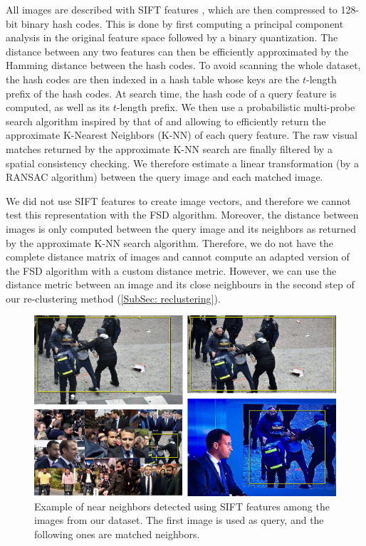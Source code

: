\begin{enumerate}
    All images are described with SIFT features \cite{lowe1999object}, which are then compressed to 128-bit binary hash codes. This is done by first computing a principal component analysis in the original feature space followed by a binary quantization. The distance between any two features can then be efficiently approximated by the Hamming distance between the hash codes. To avoid scanning the whole dataset, the hash codes are then indexed in a hash table whose keys are the $t$-length prefix of the hash codes. At search time, the hash code  of a query feature is computed, as well as its $t$-length prefix. We then use a probabilistic multi-probe search algorithm inspired by that of \cite{joly2008posteriori} and allowing to efficiently return the approximate K-Nearest Neighbors (K-NN) of each query feature. The raw visual matches returned by the approximate K-NN search are finally filtered by a spatial consistency checking. We therefore estimate a linear transformation (by a RANSAC algorithm) between the query image and each matched image.
    
    We did not use SIFT features to create image vectors, and therefore we cannot test this representation with the FSD algorithm. Moreover, the distance between images is only computed between the query image and its neighbors as returned by the approximate K-NN search algorithm. Therefore, we do not have the complete distance matrix of images and cannot compute an adapted version of the FSD algorithm with a custom distance metric. However, we can use the distance metric between an image and its close neighbours in the second step of our re-clustering method (\ref{SubSec: reclustering}).
    
\begin{figure}[h]
  \centering
  \includegraphics[width=\linewidth]{./figures/Benalla.png}
  \caption{Example of near neighbors detected using SIFT features among the images from our dataset. The first image is used as query, and the following ones are matched neighbors.}
  \label{Fig:Benalla}
\end{figure}

\end{enumerate}

